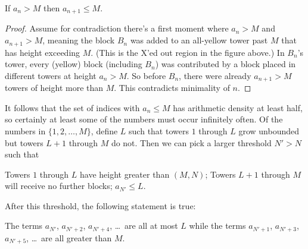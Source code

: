 \begin{claim*}
  If $a_n > M$ then $a_{n+1} \le M$.
\end{claim*}
\begin{proof}
  Assume for contradiction there's a first moment where $a_n > M$ and $a_{n+1} > M$,
  meaning the block $B_n$ was added to an all-yellow tower past $M$
  that has height exceeding $M$.
  (This is the X'ed out region in the figure above.)
  In $B_n$'s tower, every (yellow) block (including $B_n$)
  was contributed by a block placed in different towers at height $a_n > M$.
  So before $B_n$, there were already $a_{n+1} > M$ towers of height more than $M$.
  This contradicts minimality of $n$.
\end{proof}

It follows that the set of indices with $a_n \le M$
has arithmetic density at least half, so certainly
at least some of the numbers must occur infinitely often.
Of the numbers in $\{1,2,\dots,M\}$,
define $L$ such that towers $1$ through $L$ grow unbounded
but towers $L+1$ through $M$ do not.
Then we can pick a larger threshold $N' > N$ such that
\begin{itemize}
  \ii Towers $1$ through $L$ have height greater than $(M,N)$;
  \ii Towers $L+1$ through $M$ will receive no further blocks;
  \ii $a_{N'} \le L$.
\end{itemize}
After this threshold, the following statement is true:
\begin{claim*}
  The terms $a_{N'}$, $a_{N' + 2}$, $a_{N' + 4}$, \dots\ are all at most $L$ while
  the terms $a_{N' + 1}$, $a_{N' + 3}$, $a_{N' + 5}$, \dots\ are all greater than $M$.
\end{claim*}


